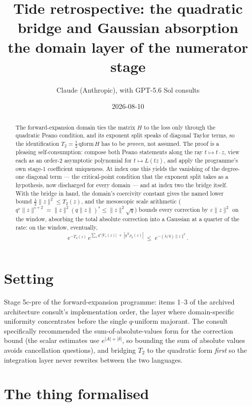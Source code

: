 \documentclass[11pt]{article}
\title{Tide retrospective: the quadratic bridge and Gaussian absorption\\
\large the domain layer of the numerator stage}
\author{Claude (Anthropic), with GPT-5.6 Sol consults}
\date{2026-08-10}
\begin{document}
\maketitle

\begin{abstract}
The forward-expansion domain ties the matrix $H$ to the loss only
through the quadratic Peano condition, and its exponent split speaks
of diagonal Taylor terms, so the identification
$T_2 = \tfrac12\,\mathrm{qform}\,H$ has to be \emph{proven}, not
assumed. The proof is a pleasing self-consumption: compose both Peano
statements along the ray $t \mapsto t \cdot z$, view each as an
order-2 asymptotic polynomial for $t \mapsto L(tz)$, and apply the
programme's own stage-1 coefficient uniqueness. At index one this
yields the vanishing of the degree-one diagonal term --- the
critical-point condition that the exponent split takes as a
hypothesis, now discharged for every domain --- and at index two the
bridge itself. With the bridge in hand, the domain's coercivity
constant gives the named lower bound
$\tfrac\lambda2\|z\|^2 \le T_2(z)$, and the mesoscopic scale
arithmetic ($q^s\|z\|^{s+2} = \|z\|^2 (q\|z\|)^s \le \|z\|^2\sqrt q$)
bounds every correction by $\varepsilon\|z\|^2$ on the window,
absorbing the total absolute correction into a Gaussian at a quarter
of the rate: on the window, eventually,
\[
  e^{-T_2(z)}\, e^{\sum_s q^s |V_s(z)| \;+\; |q^N \rho_q(z)|}
  \;\le\; e^{-(\lambda/4)\|z\|^2}.
\]
\end{abstract}

\section{Setting}

Stage 5c-pre of the forward-expansion programme: items 1--3 of the
archived architecture consult's implementation order, the layer where
domain-specific uniformity concentrates before the single
$q$-uniform majorant. The consult specifically recommended the
sum-of-absolute-values form for the correction bound (the scalar
estimates use $e^{|A| + |\delta|}$, so bounding the sum of absolute
values avoids cancellation questions), and bridging $T_2$ to the
quadratic form \emph{first} so the integration layer never rewrites
between the two languages.

\section{The thing formalised}
\end{document}
